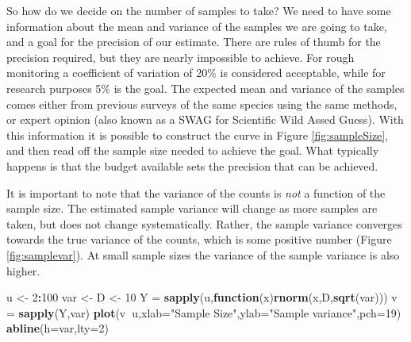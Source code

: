 \documentclass[]{book}
\newenvironment{Shaded}{\begin{snugshade}}{\end{snugshade}}
\newcommand{\ControlFlowTok}[1]{\textcolor[rgb]{0.13,0.29,0.53}{\textbf{#1}}}
\newcommand{\DataTypeTok}[1]{\textcolor[rgb]{0.13,0.29,0.53}{#1}}
\newcommand{\DecValTok}[1]{\textcolor[rgb]{0.00,0.00,0.81}{#1}}
\newcommand{\KeywordTok}[1]{\textcolor[rgb]{0.13,0.29,0.53}{\textbf{#1}}}
\newcommand{\NormalTok}[1]{#1}
\newcommand{\OperatorTok}[1]{\textcolor[rgb]{0.81,0.36,0.00}{\textbf{#1}}}
\newcommand{\StringTok}[1]{\textcolor[rgb]{0.31,0.60,0.02}{#1}}
\theoremstyle{definition}
\theoremstyle{definition}
\theoremstyle{definition}
\theoremstyle{remark}
\begin{document}
So how do we decide on the number of samples to take? We need to have
some information about the mean and variance of the samples we are going
to take, and a goal for the precision of our estimate. There are rules
of thumb for the precision required, but they are nearly impossible to
achieve. For rough monitoring a coefficient of variation of 20\% is
considered acceptable, while for research purposes 5\% is the goal. The
expected mean and variance of the samples comes either from previous
surveys of the same species using the same methods, or expert opinion
(also known as a SWAG for Scientific Wild Assed Guess). With this
information it is possible to construct the curve in Figure
\ref{fig:sampleSize}, and then read off the sample size needed to
achieve the goal. What typically happens is that the budget available
sets the precision that can be achieved.

It is important to note that the variance of the counts is \emph{not} a
function of the sample size. The estimated sample variance will change
as more samples are taken, but does not change systematically. Rather,
the sample variance converges towards the true variance of the counts,
which is some positive number (Figure \ref{fig:samplevar}). At small
sample sizes the variance of the sample variance is also higher.

\begin{Shaded}
\begin{Highlighting}[]
\NormalTok{u <-}\StringTok{ }\DecValTok{2}\OperatorTok{:}\DecValTok{100}
\NormalTok{var <-}\StringTok{ }\NormalTok{D <-}\StringTok{ }\DecValTok{10}
\NormalTok{Y =}\StringTok{ }\KeywordTok{sapply}\NormalTok{(u,}\ControlFlowTok{function}\NormalTok{(x)}\KeywordTok{rnorm}\NormalTok{(x,D,}\KeywordTok{sqrt}\NormalTok{(var)))}
\NormalTok{v =}\StringTok{ }\KeywordTok{sapply}\NormalTok{(Y,var)}
\KeywordTok{plot}\NormalTok{(v}\OperatorTok{~}\NormalTok{u,}\DataTypeTok{xlab=}\StringTok{"Sample Size"}\NormalTok{,}\DataTypeTok{ylab=}\StringTok{"Sample variance"}\NormalTok{,}\DataTypeTok{pch=}\DecValTok{19}\NormalTok{)}
\KeywordTok{abline}\NormalTok{(}\DataTypeTok{h=}\NormalTok{var,}\DataTypeTok{lty=}\DecValTok{2}\NormalTok{)}
\end{Highlighting}
\end{Shaded}
\end{document}
